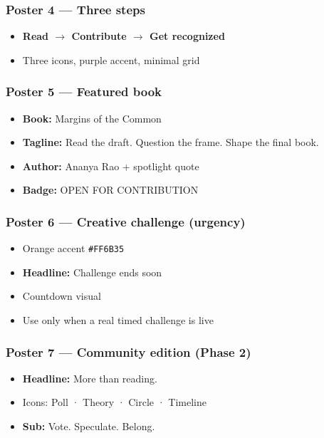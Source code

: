 \documentclass[11pt,a4paper]{report}
\begin{document}
\subsubsection{Poster 4 --- Three steps}
\begin{itemize}
  \item \textbf{Read $\rightarrow$ Contribute $\rightarrow$ Get recognized}
  \item Three icons, purple accent, minimal grid
\end{itemize}

\subsubsection{Poster 5 --- Featured book}
\begin{itemize}
  \item \textbf{Book:} Margins of the Common
  \item \textbf{Tagline:} Read the draft. Question the frame. Shape the final book.
  \item \textbf{Author:} Ananya Rao + spotlight quote
  \item \textbf{Badge:} OPEN FOR CONTRIBUTION
\end{itemize}

\subsubsection{Poster 6 --- Creative challenge (urgency)}
\begin{itemize}
  \item Orange accent \texttt{\#FF6B35}
  \item \textbf{Headline:} Challenge ends soon
  \item Countdown visual
  \item Use only when a real timed challenge is live
\end{itemize}

\subsubsection{Poster 7 --- Community edition (Phase 2)}
\begin{itemize}
  \item \textbf{Headline:} More than reading.
  \item Icons: Poll · Theory · Circle · Timeline
  \item \textbf{Sub:} Vote. Speculate. Belong.
\end{itemize}
\end{document}
